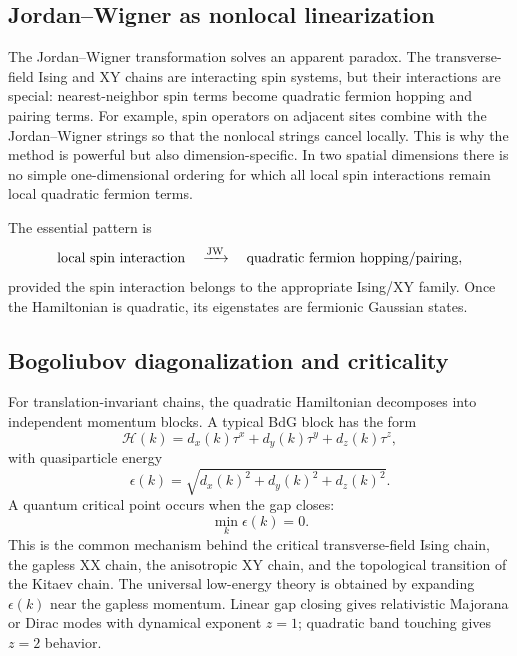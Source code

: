 \subsection{Jordan--Wigner as nonlocal linearization}

The Jordan--Wigner transformation solves an apparent paradox.  The transverse-field Ising and XY chains are interacting spin systems, but their interactions are special: nearest-neighbor spin terms become quadratic fermion hopping and pairing terms.  For example, spin operators on adjacent sites combine with the Jordan--Wigner strings so that the nonlocal strings cancel locally.  This is why the method is powerful but also dimension-specific.  In two spatial dimensions there is no simple one-dimensional ordering for which all local spin interactions remain local quadratic fermion terms.

The essential pattern is
\begin{equation}
\label{eq:conclusion-spin-to-fermion-pattern}
    \text{local spin interaction}
    \quad\xrightarrow{\rm JW}\quad
    \text{quadratic fermion hopping/pairing},
\end{equation}
provided the spin interaction belongs to the appropriate Ising/XY family.  Once the Hamiltonian is quadratic, its eigenstates are fermionic Gaussian states.

\subsection{Bogoliubov diagonalization and criticality}

For translation-invariant chains, the quadratic Hamiltonian decomposes into independent momentum blocks.  A typical BdG block has the form
\begin{equation}
\label{eq:conclusion-bdg-d-vector}
    \mathcal{H}(k)
    =
    d_x(k)\tau^x+d_y(k)\tau^y+d_z(k)\tau^z,
\end{equation}
with quasiparticle energy
\begin{equation}
\label{eq:conclusion-free-spectrum}
    \epsilon(k)=\sqrt{d_x(k)^2+d_y(k)^2+d_z(k)^2}.
\end{equation}
A quantum critical point occurs when the gap closes:
\begin{equation}
\label{eq:conclusion-gap-closing}
    \min_k \epsilon(k)=0.
\end{equation}
This is the common mechanism behind the critical transverse-field Ising chain, the gapless XX chain, the anisotropic XY chain, and the topological transition of the Kitaev chain.  The universal low-energy theory is obtained by expanding \(\epsilon(k)\) near the gapless momentum.  Linear gap closing gives relativistic Majorana or Dirac modes with dynamical exponent \(z=1\); quadratic band touching gives \(z=2\) behavior.

